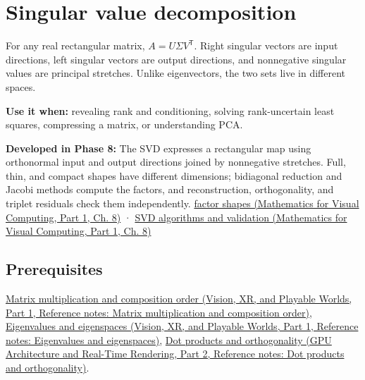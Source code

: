 \hypertarget{appendix-1fad5e7f36fa}{}\label{referencestart:appendix-1fad5e7f36fa}
\section{Singular value decomposition}\label{appendix-1fad5e7f36fa-singular-value-decomposition}

\hypertarget{appendix-1fad5e7f36fa-singular-value-decomposition}{}

For any real rectangular matrix, \(A=U\Sigma V^\mathsf T\). Right singular vectors are input directions, left singular vectors are output directions, and nonnegative singular values are principal stretches. Unlike eigenvectors, the two sets live in different spaces.

\textbf{Use it when:} revealing rank and conditioning, solving rank-uncertain least squares, compressing a matrix, or understanding PCA.

\textbf{Developed in Phase 8:} The SVD expresses a rectangular map using orthonormal input and output directions joined by nonnegative stretches. Full, thin, and compact shapes have different dimensions; bidiagonal reduction and Jacobi methods compute the factors, and reconstruction, orthogonality, and triplet residuals check them independently. \href{../02-Mathematics-for-Visual-Computing-P01/main.pdf\#nameddest=02-foundations-ii-ch024-full-thin-and-compact-shapes-for-tall-and-wide-matrices}{factor shapes (Mathematics for Visual Computing, Part 1, Ch. 8)} · \href{../02-Mathematics-for-Visual-Computing-P01/main.pdf\#nameddest=02-foundations-ii-ch024-how-numerical-software-computes-and-checks-an-svd}{SVD algorithms and validation (Mathematics for Visual Computing, Part 1, Ch. 8)}

\subsection{Prerequisites}\label{appendix-1fad5e7f36fa-prerequisites}

\hypertarget{appendix-1fad5e7f36fa-prerequisites}{}

\href{../07-Vision-XR-and-Playable-Worlds-P01/main.pdf\#nameddest=appendix-ab31ef447dbf}{Matrix multiplication and composition order (Vision, XR, and Playable Worlds, Part 1, Reference notes: Matrix multiplication and composition order)}, \href{../07-Vision-XR-and-Playable-Worlds-P01/main.pdf\#nameddest=appendix-0b3be18411f9}{Eigenvalues and eigenspaces (Vision, XR, and Playable Worlds, Part 1, Reference notes: Eigenvalues and eigenspaces)}, \href{../06-GPU-Architecture-and-Real-Time-Rendering-P02/main.pdf\#nameddest=appendix-8bc4e8fc547c}{Dot products and orthogonality (GPU Architecture and Real-Time Rendering, Part 2, Reference notes: Dot products and orthogonality)}.

